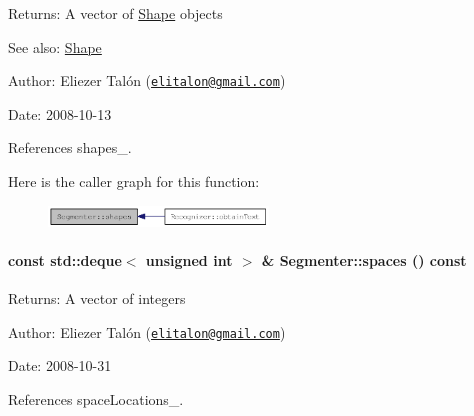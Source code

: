\begin{Desc}
\item[Returns:]A vector of \hyperlink{class_shape}{Shape} objects\end{Desc}
\begin{Desc}
\item[See also:]\hyperlink{class_shape}{Shape}\end{Desc}
\begin{Desc}
\item[Author:]Eliezer Talón (\href{mailto:elitalon@gmail.com}{\tt elitalon@gmail.com}) \end{Desc}
\begin{Desc}
\item[Date:]2008-10-13 \end{Desc}


References shapes\_\-.

Here is the caller graph for this function:\nopagebreak
\begin{figure}[H]
\begin{center}
\leavevmode
\includegraphics[width=166pt]{class_segmenter_7ddded12f26e94e6f5cba2752d2c4142_icgraph}
\end{center}
\end{figure}
\hypertarget{class_segmenter_eed49de2d6548ae8016bf6c9c78cec99}{
\paragraph[spaces]{\setlength{\rightskip}{0pt plus 5cm}const std::deque$<$ unsigned int $>$ \& Segmenter::spaces () const}\hfill}
\label{class_segmenter_eed49de2d6548ae8016bf6c9c78cec99}


\begin{Desc}
\item[Returns:]A vector of integers\end{Desc}
\begin{Desc}
\item[Author:]Eliezer Talón (\href{mailto:elitalon@gmail.com}{\tt elitalon@gmail.com}) \end{Desc}
\begin{Desc}
\item[Date:]2008-10-31 \end{Desc}


References spaceLocations\_\-.

